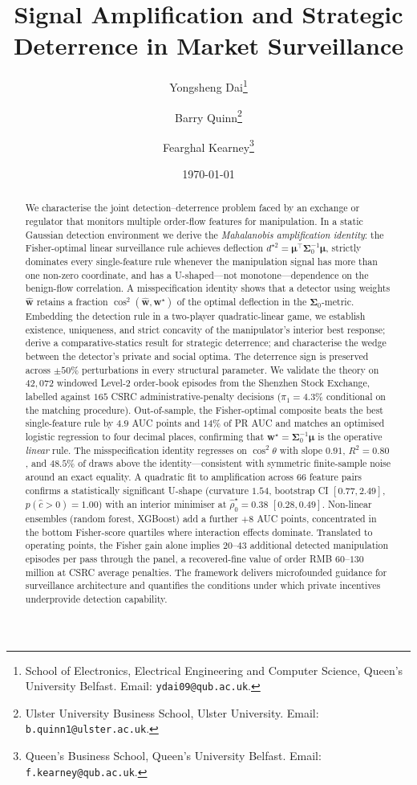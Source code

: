 \documentclass[11pt,a4paper]{article}
\title{\large\bfseries Signal Amplification and Strategic Deterrence in Market Surveillance}
\author{Yongsheng Dai\thanks{School of Electronics, Electrical Engineering and Computer Science, Queen's University Belfast. Email: \texttt{ydai09@qub.ac.uk}.} \and
Barry Quinn\thanks{Ulster University Business School, Ulster University. Email: \texttt{b.quinn1@ulster.ac.uk}.} \and
Fearghal Kearney\thanks{Queen's Business School, Queen's University Belfast. Email: \texttt{f.kearney@qub.ac.uk}.}}
\date{\today}
\theoremstyle{definition}
\theoremstyle{remark}
\newcommand{\1}{\mathbf{1}}
\newcommand{\w}{\mathbf{w}}
\newcommand{\mmu}{\boldsymbol{\mu}}
\newcommand{\Sig}{\boldsymbol{\Sigma}}
\newcommand{\trans}{^{\!\top}}
\begin{document}
\maketitle

\begin{abstract}
We characterise the joint detection--deterrence problem faced by an exchange or regulator that monitors multiple order-flow features for manipulation. In a static Gaussian detection environment we derive the \emph{Mahalanobis amplification identity}: the Fisher-optimal linear surveillance rule achieves deflection $d^{\star 2}=\mmu\trans\Sig_0^{-1}\mmu$, strictly dominates every single-feature rule whenever the manipulation signal has more than one non-zero coordinate, and has a U-shaped---not monotone---dependence on the benign-flow correlation. A misspecification identity shows that a detector using weights $\widehat{\w}$ retains a fraction $\cos^2(\widehat{\w},\w^\star)$ of the optimal deflection in the $\Sig_0$-metric. Embedding the detection rule in a two-player quadratic-linear game, we establish existence, uniqueness, and strict concavity of the manipulator's interior best response; derive a comparative-statics result for strategic deterrence; and characterise the wedge between the detector's private and social optima. The deterrence sign is preserved across $\pm 50\%$ perturbations in every structural parameter. We validate the theory on $42{,}072$ windowed Level-2 order-book episodes from the Shenzhen Stock Exchange, labelled against $165$ CSRC administrative-penalty decisions ($\pi_1 = 4.3\%$ conditional on the matching procedure). Out-of-sample, the Fisher-optimal composite beats the best single-feature rule by $4.9$ AUC points and $14\%$ of PR AUC and matches an optimised logistic regression to four decimal places, confirming that $\w^\star=\Sig_0^{-1}\mmu$ is the operative \emph{linear} rule. The misspecification identity regresses on $\cos^2\theta$ with slope $0.91$, $R^2 = 0.80$, and $48.5\%$ of draws above the identity---consistent with symmetric finite-sample noise around an exact equality. A quadratic fit to amplification across $66$ feature pairs confirms a statistically significant U-shape (curvature $1.54$, bootstrap CI $[0.77, 2.49]$, $p(\widehat c>0)=1.00$) with an interior minimiser at $\widehat\rho_0^\star = 0.38$ $[0.28, 0.49]$. Non-linear ensembles (random forest, XGBoost) add a further $+8$ AUC points, concentrated in the bottom Fisher-score quartiles where interaction effects dominate. Translated to operating points, the Fisher gain alone implies $20$--$43$ additional detected manipulation episodes per pass through the panel, a recovered-fine value of order RMB $60$--$130$ million at CSRC average penalties. The framework delivers microfounded guidance for surveillance architecture and quantifies the conditions under which private incentives underprovide detection capability.
\end{abstract}
\end{document}
